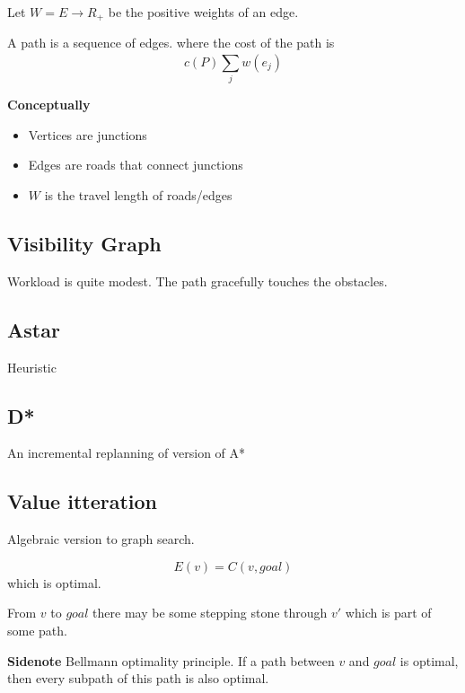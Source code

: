 \documentclass[a4paper]{article}
\begin{document}
Let $ W = E \rightarrow R_{+} $ be the positive weights of an edge.

A path is a sequence of edges. where the cost of the path is
\begin{equation}
c(P) \sum_{j}^{}{w(e_j)}
\end{equation}

\textbf{Conceptually} 
\begin{itemize}
	\item Vertices are junctions
	\item Edges are roads that connect junctions
	\item $ W $ is the travel length of roads/edges
\end{itemize}





\subsection{Visibility Graph}
Workload is quite modest.
The path gracefully touches the obstacles.


\subsection{Astar}
Heuristic

\subsection{D*}
An incremental replanning of version of A*

\subsection{Value itteration}
Algebraic version to graph search.

\begin{equation}
E(v) = C(v, goal)
\end{equation}
which is optimal.

From $ v $ to  $ goal $ there may be some stepping stone through  $ v' $ which is part of some path. 

\vspace{5pt}

\textbf{Sidenote} Bellmann optimality principle. If a path between $ v $ and  $ goal $ is optimal, then every subpath of this path is also optimal.

\end{document}
